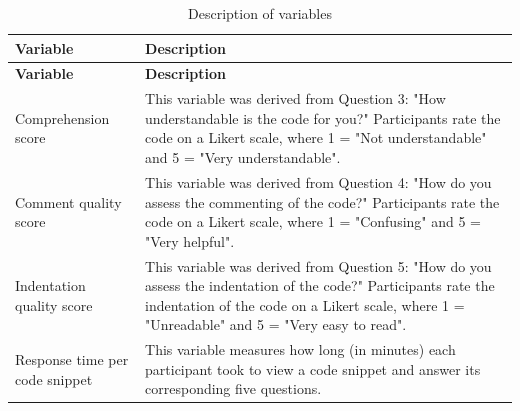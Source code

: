 \begin{longtable}{|p{5.5cm}|p{8.5cm}|}
\caption{Description of variables} \label{tab:variables} \\

\hline
\textbf{Variable} & \textbf{Description} \\
\hline
\endfirsthead

\hline
\textbf{Variable} & \textbf{Description} \\
\hline
\endhead

\hline
\parbox[t]{5.5cm}{\vspace{0.3em}Comprehension score\vspace{0.5em}} &
\parbox[t]{8.5cm}{\vspace{0.3em}This variable was derived from Question 3: "How understandable is the code for you?" Participants rate the code on a Likert scale, where 1 = "Not understandable" and 5 = "Very understandable".\vspace{0.5em}} \\
\hline

\parbox[t]{5.5cm}{\vspace{0.3em}Comment quality score\vspace{0.5em}} &
\parbox[t]{8.5cm}{\vspace{0.3em}This variable was derived from Question 4: "How do you assess the commenting of the code?" Participants rate the code on a Likert scale, where 1 = "Confusing" and 5 = "Very helpful".\vspace{0.5em}} \\
\hline

\parbox[t]{5.5cm}{\vspace{0.3em}Indentation quality score\vspace{0.5em}} &
\parbox[t]{8.5cm}{\vspace{0.3em}This variable was derived from Question 5: "How do you assess the indentation of the code?" Participants rate the indentation of the code on a Likert scale, where 1 = "Unreadable" and 5 = "Very easy to read".\vspace{0.5em}} \\
\hline

\parbox[t]{5.5cm}{\vspace{0.3em}Response time per code snippet\vspace{0.5em}} &
\parbox[t]{8.5cm}{\vspace{0.3em}This variable measures how long (in minutes) each participant took to view a code snippet and answer its corresponding five questions.\vspace{0.5em}} \\
\hline


\end{longtable}

